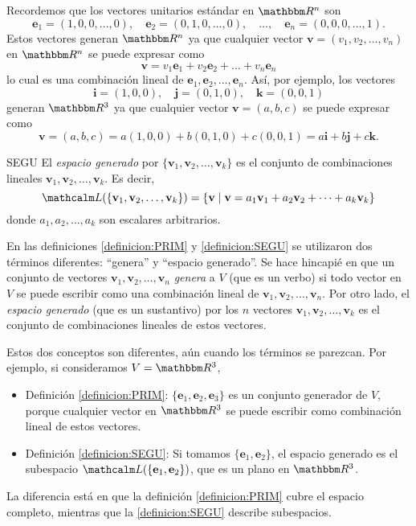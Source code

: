 \begin{examplebox}{}{}
    Recordemos que los vectores unitarios estándar en $\RR[n]$ son
    $$\mathbf{e}_1 = (1, 0, 0, \dots, 0), \quad \mathbf{e}_2 = (0, 1, 0, \dots, 0), \quad \dots, \quad \mathbf{e}_n = (0, 0, 0, \dots, 1).$$
    Estos vectores generan $\RR[n]$ ya que cualquier vector $\mathbf{v} = (v_1, v_2, \dots, v_n)$ en $\RR[n]$ se puede expresar como
    $$\mathbf{v} = v_1 \mathbf{e}_1 + v_2 \mathbf{e}_2 + \dots + v_n \mathbf{e}_n$$
    lo cual es una combinación lineal de $\mathbf{e}_1, \mathbf{e}_2, \dots, \mathbf{e}_n$. Así, por ejemplo, los vectores
    $$\mathbf{i} = (1, 0, 0), \quad \mathbf{j} = (0, 1, 0), \quad \mathbf{k} = (0, 0, 1)$$
    generan $\RR[3]$ ya que cualquier vector $\mathbf{v} = (a, b, c)$ se puede expresar como
    $$\mathbf{v} = (a, b, c) = a(1, 0, 0) + b(0, 1, 0) + c(0, 0, 1) = a\mathbf{i} + b\mathbf{j} + c\mathbf{k}.$$
\end{examplebox}

\begin{definicion}{}{SEGU}
    El \emph{espacio generado} por $\{\mathbf{v}_1, \mathbf{v}_2, \dots, \mathbf{v}_k\}$ es el conjunto de combinaciones lineales $\mathbf{v}_1, \mathbf{v}_2, \dots, \mathbf{v}_k$. Es decir,
    $$\Gen (\{\mathbf{v}_1, \mathbf{v}_2, \dots, \mathbf{v}_k\}) = \{\mathbf{v} \mid \mathbf{v} = a_1\mathbf{v}_1 + a_2\mathbf{v}_2 + \dots + a_k\mathbf{v}_k\}$$
    donde $a_1, a_2, \dots, a_k$ son escalares arbitrarios.
\end{definicion}

En las definiciones \ref{definicion:PRIM} y \ref{definicion:SEGU} se utilizaron dos términos diferentes: “genera” y “espacio generado”. Se hace hincapié en que un conjunto de vectores $\mathbf{v}_1, \mathbf{v}_2, \dots, \mathbf{v}_n$ \emph{genera} a $V$ (que es un verbo) si todo vector en $V$ se puede escribir como una combinación lineal de $\mathbf{v}_1, \mathbf{v}_2, \dots, \mathbf{v}_n$. Por otro lado, el \emph{espacio generado} (que es un sustantivo) por los $n$ vectores $\mathbf{v}_1, \mathbf{v}_2, \dots, \mathbf{v}_k$ es el conjunto de combinaciones lineales de estos vectores.

Estos dos conceptos son diferentes, aún cuando los términos se parezcan. Por ejemplo, si consideramos $V = \RR[3]$,
\begin{itemize}
    \item Definición \ref{definicion:PRIM}: $\{\mathbf{e}_1, \mathbf{e}_2, \mathbf{e}_3\}$ es un conjunto generador de $V$, porque cualquier vector en $\RR[3]$ se puede escribir como combinación lineal de estos vectores.\newpage
    \item Definición \ref{definicion:SEGU}: Si tomamos $\{\mathbf{e}_1, \mathbf{e}_2\}$, el espacio generado es el subespacio $\Gen (\{\mathbf{e}_1, \mathbf{e}_2\})$, que es un plano en $\RR[3]$.
\end{itemize}
La diferencia está en que la definición \ref{definicion:PRIM} cubre el espacio completo, mientras que la \ref{definicion:SEGU} describe subespacios.

